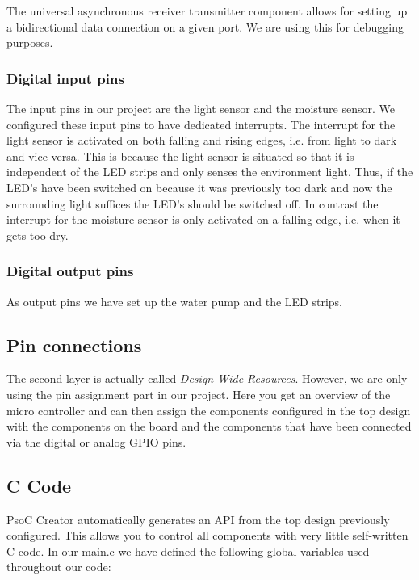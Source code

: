 \documentclass[11pt, oneside]{scrartcl}   	%
\begin{document}
The universal asynchronous receiver transmitter component allows for setting up a bidirectional data connection on a given port. We are using this for debugging purposes. 

\subsubsection{Digital input pins}

The input pins in our project are the light sensor and the moisture sensor. We configured these input pins to have dedicated interrupts. The interrupt for the light sensor is activated on both falling and rising edges, i.e. from light to dark and vice versa. This is because the light sensor is situated so that it is independent of the LED strips and only senses the environment light. Thus, if the LED's have been switched on because it was previously too dark and now the surrounding light suffices the LED's should be switched off. In contrast the interrupt for the moisture sensor is only activated on a falling edge, i.e. when it gets too dry. 

\subsubsection{Digital output pins}

As output pins we have set up the water pump and the LED strips.

\subsection{Pin connections}

The second layer is actually called \emph{Design Wide Resources}. However, we are only using the pin assignment part in our project. Here you get an overview of the micro controller  and can then assign the components configured in the top design with the components on the board and the components that have been connected via the digital or analog GPIO pins.

\subsection{C Code}

PsoC Creator automatically generates an API from the top design previously configured. This allows you to control all components with very little self-written C code.
In our main.c we have defined the following global variables used throughout our code:
\end{document}
